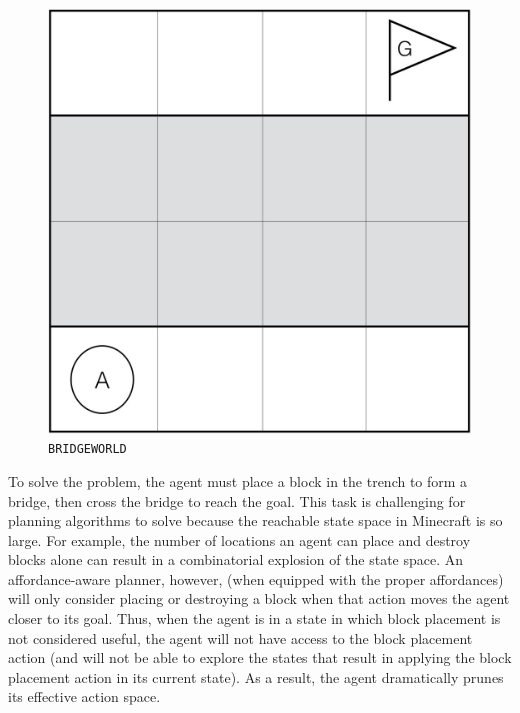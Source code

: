 \documentclass[]{article}
\begin{document}
\begin{figure}
\centering
\includegraphics[scale=0.14]{figures/bridgeworld.jpg}
\caption{\texttt{BRIDGEWORLD}
\label{fig:bridgeworld}}
\end{figure}

To solve the problem, the agent must place a block in the trench to
form a bridge, then cross the bridge to reach the goal.  This task is
challenging for planning algorithms to solve because the reachable
state space in Minecraft is so large. For example, the number of
locations an agent can place and destroy blocks alone can result in a
combinatorial explosion of the state space. An affordance-aware
planner, however, (when equipped with the proper affordances) will
only consider placing or destroying a block when that action moves
the agent closer to its goal. Thus, when the agent is in a state in
which block placement is not considered useful, the agent will not
have access to the block placement action (and will not be able to
explore the states that result in applying the block placement action
in its current state). As a result, the agent dramatically prunes its
effective action space.


\end{document}
